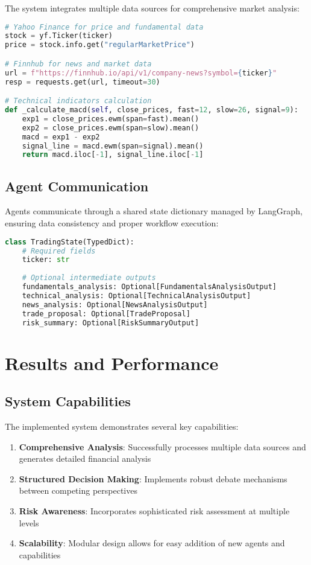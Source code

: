 \documentclass[11pt,a4paper]{article}
\begin{document}
The system integrates multiple data sources for comprehensive market analysis:

\begin{lstlisting}[language=Python,caption=Data Source Integration Example]
# Yahoo Finance for price and fundamental data
stock = yf.Ticker(ticker)
price = stock.info.get("regularMarketPrice")

# Finnhub for news and market data
url = f"https://finnhub.io/api/v1/company-news?symbol={ticker}"
resp = requests.get(url, timeout=30)

# Technical indicators calculation
def _calculate_macd(self, close_prices, fast=12, slow=26, signal=9):
    exp1 = close_prices.ewm(span=fast).mean()
    exp2 = close_prices.ewm(span=slow).mean()
    macd = exp1 - exp2
    signal_line = macd.ewm(span=signal).mean()
    return macd.iloc[-1], signal_line.iloc[-1]
\end{lstlisting}

\subsection{Agent Communication}

Agents communicate through a shared state dictionary managed by LangGraph, ensuring data consistency and proper workflow execution:

\begin{lstlisting}[language=Python,caption=State Management Example]
class TradingState(TypedDict):
    # Required fields
    ticker: str
    
    # Optional intermediate outputs
    fundamentals_analysis: Optional[FundamentalsAnalysisOutput]
    technical_analysis: Optional[TechnicalAnalysisOutput]
    news_analysis: Optional[NewsAnalysisOutput]
    trade_proposal: Optional[TradeProposal]
    risk_summary: Optional[RiskSummaryOutput]
\end{lstlisting}

\section{Results and Performance}

\subsection{System Capabilities}

The implemented system demonstrates several key capabilities:

\begin{enumerate}
    \item \textbf{Comprehensive Analysis}: Successfully processes multiple data sources and generates detailed financial analysis
    \item \textbf{Structured Decision Making}: Implements robust debate mechanisms between competing perspectives
    \item \textbf{Risk Awareness}: Incorporates sophisticated risk assessment at multiple levels
    \item \textbf{Scalability}: Modular design allows for easy addition of new agents and capabilities
\end{enumerate}
\end{document}
